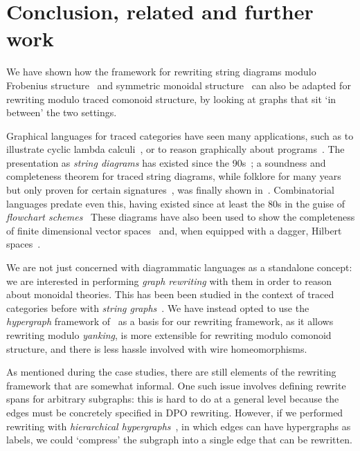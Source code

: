 \section{Conclusion, related and further work}

We have shown how the framework for rewriting string diagrams modulo Frobenius
structure~\cite{bonchi2022string} and symmetric monoidal
structure~\cite{bonchi2022stringa} can also be adapted for rewriting modulo
traced comonoid structure, by looking at graphs that sit `in between' the two
settings.

Graphical languages for traced categories have seen many applications, such as
to illustrate cyclic lambda calculi~\cite{hasegawa1997recursion}, or to reason
graphically about programs~\cite{schweimeier1999categorical}.
The presentation as \emph{string diagrams} has existed since the
90s~\cite{joyal1991geometry,joyal1996traced}; a soundness and completeness
theorem for traced string diagrams, while folklore for many years but only
proven for certain signatures~\cite{selinger2011survey}, was finally shown
in~\cite{kissinger2014abstract}.
Combinatorial languages predate even this, having existed since at least the 80s
in the guise of
\emph{flowchart schemes}~\cite{stefanescu1990feedback,cazanescu1990new,cazanescu1994feedback}
These diagrams have also been used to show the completeness of finite dimensional
vector spaces~\cite{hasegawa2008finite} and, when equipped with a dagger,
Hilbert spaces~\cite{selinger2012finite}.

We are not just concerned with diagrammatic languages as a standalone concept:
we are interested in performing \emph{graph rewriting} with them in order to
reason about monoidal theories.
This has been been studied in the context of traced categories before with
\emph{string graphs}~\cite{kissinger2012pictures,dixon2013opengraphs}.
We have instead opted to use the \emph{hypergraph} framework
of~\cite{bonchi2022string,bonchi2022stringa,bonchi2022stringb} as a basis for our
rewriting framework, as it allows rewriting modulo \emph{yanking}, is more
extensible for rewriting modulo comonoid structure, and there is less hassle
involved with wire homeomorphisms.

As mentioned during the case studies, there are still elements of the rewriting
framework that are somewhat informal.
One such issue involves defining rewrite spans for arbitrary subgraphs: this is
hard to do at a general level because the edges must be concretely specified in
DPO rewriting.
However, if we performed rewriting with
\emph{hierarchical hypergraphs}~\cite{alvarez-picallo2021functorial}, in
which edges can have hypergraphs as labels, we could `compress' the subgraph
into a single edge that can be rewritten.

